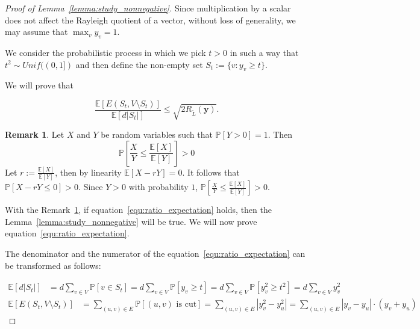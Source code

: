 \documentclass[a4paper]{article}
\theoremstyle{definition}
\newtheorem{remark}{Remark}[section]
\begin{document}
\begin{proof}[Proof of Lemma~\ref{lemma:study_nonnegative}]
\hfill

Since multiplication by a scalar does not affect the Rayleigh quotient of a vector, without loss of generality, we may assume that $\max_v y_v=1$. 

We consider the probabilistic process in which we pick $t > 0$ in such a way that $t^2\sim Unif((0, 1])$ and then define the non-empty set $S_{t}:=\{v: y_v \geq t\}$.

We will prove that

\begin{equation}
    \label{equ:ratio_expectation}
    \frac{\mathbb{E}[E(S_t, V\setminus S_t)]}{\mathbb{E}[d|S_t|]}\leq \sqrt{2R_{\tilde{L}}(\textbf{y})}.
\end{equation}
\hfill

\begin{remark} 
\label{rem:probability}
Let $X$ and $Y$ be random variables such that $\mathbb{P}[Y > 0] = 1$. Then 
\begin{equation}
    \mathbb{P}\left[\frac{X}{Y}\leq \frac{\mathbb{E}[X]}{\mathbb{E}[Y]}\right] > 0
\end{equation}
Let $r:=\frac{\mathbb{E}[X]}{\mathbb{E}[Y]}$, then by linearity $\mathbb{E}[X-rY]=0$. It follows that $\mathbb{P}[X-rY\leq 0] > 0$. Since $Y > 0$ with probability $1$, $\mathbb{P}\left[\frac{X}{Y}\leq \frac{\mathbb{E}[X]}{\mathbb{E}[Y]}\right] > 0$.
\end{remark}

With the Remark~\ref{rem:probability}, if equation~\ref{equ:ratio_expectation} holds, then the Lemma~\ref{lemma:study_nonnegative} will be true. We will now prove equation~\ref{equ:ratio_expectation}.

The denominator and the numerator of the equation~\ref{equ:ratio_expectation} can be transformed as follows:

\begin{align}
    \mathbb{E}[d|S_t|] &= d\sum_{v\in V}\mathbb{P}[v\in S_t] = d\sum_{v\in V}\mathbb{P}[y_v\geq t] = d\sum_{v\in V}\mathbb{P}[y_v^2\geq t^2] = d\sum_{v\in V}y_v^2
\end{align}
\begin{align}
    \mathbb{E}[E(S_t, V\setminus S_t)] &= \sum_{(u, v)\in E}\mathbb{P}[(u,v)\text{ is cut}] = \sum_{(u, v)\in E}|y_v^2-y_u^2| = \sum_{(u, v)\in E}|y_v-y_u|\cdot (y_v+y_u)
\end{align}


\end{proof}
\end{document}
